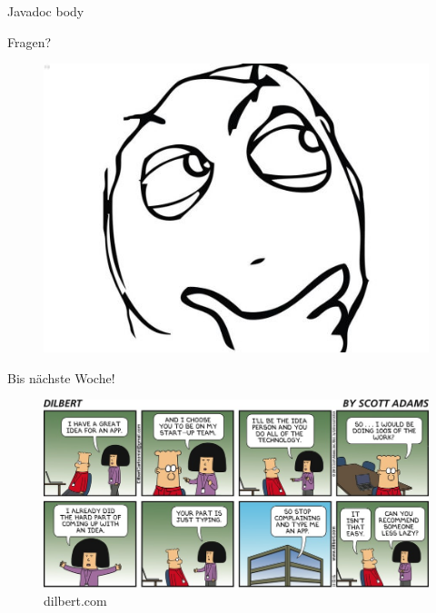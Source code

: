 \documentclass[18pt]{beamer}
\begin{document}
\begin{frame}{Javadoc}
    body
\end{frame}

\begin{frame}{Fragen?}
    \begin{figure}
        \includegraphics[scale=.3]{img/Question-Rage-Face.jpg}
    \end{figure}
\end{frame}

\begin{frame}{Bis nächste Woche!}
    \begin{figure}
        \includegraphics[scale=2.8]{img/dt161113.jpg}
        \caption{\footnotesize{dilbert.com}}
    \end{figure}
\end{frame}

\backupend
\end{document}
